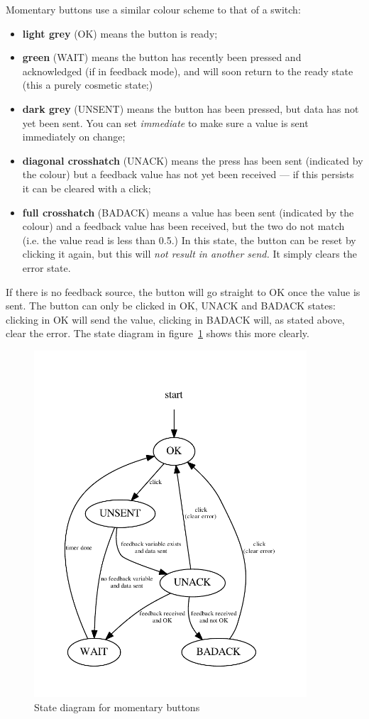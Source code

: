 Momentary buttons use a similar colour scheme to that of a switch:
\begin{itemize}
\item \textbf{light grey} (OK) means the button is ready;
\item \textbf{green} (WAIT) means the button has recently been pressed and acknowledged (if in feedback mode),
and will soon return to the ready state (this a purely cosmetic state;)
\item \textbf{dark grey} (UNSENT) means the button has been pressed, but data has not yet been sent. You can set \emph{immediate} to
make sure a value is sent immediately on change;
\item \textbf{diagonal crosshatch} (UNACK) means the press has been sent (indicated by the colour) but a feedback value has
not yet been received --- if this persists it can be cleared with a click;
\item \textbf{full crosshatch} (BADACK) means a value has been sent (indicated by the colour) and a feedback value has
been received, but the two do not match (i.e. the value read is less than 0.5.) In this state, the button can be reset by clicking
it again, but this will \emph{not result in another send.} It simply clears the error state.
\end{itemize}
If there is no feedback source, the button will go straight to OK once the
value is sent. The button can only be clicked in OK, UNACK and BADACK states: clicking in
OK will send the value, clicking in BADACK will, as stated above, clear the error.
The state diagram in figure~\ref{momstates} shows this more clearly.
\begin{figure}[ht]
\center
\includegraphics[width=4in]{stateMomentary.pdf}
\caption{State diagram for momentary buttons}
\label{momstates}
\end{figure}


